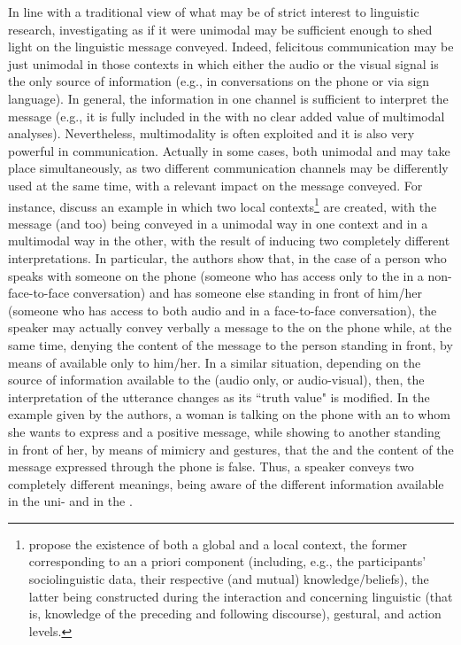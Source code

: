 \documentclass[output=paper]{langsci/langscibook}
\begin{document}
In line with a traditional view of what may be of strict interest to linguistic research, investigating  as if it were unimodal may be sufficient enough to shed light on the linguistic message conveyed. Indeed, felicitous communication may be just unimodal in those contexts in which either the audio or the visual signal is the only source of information (e.g., in conversations on the phone or via sign language). In general, the information in one channel is sufficient to interpret the message (e.g., it is fully included in the  with no clear added value of multimodal analyses). Nevertheless, multimodality is often exploited and it is also very powerful in communication. Actually in some cases, both unimodal and  may take place simultaneously, as two different communication channels may be differently used at the same time, with a relevant impact on the message conveyed. For instance, \citet[118--119]{GiliFivela2014} discuss an example in which two local contexts\footnote{\citet{Akman.2003} propose the existence of both a global and a local context, the former corresponding to an a priori component (including, e.g., the participants’ sociolinguistic data, their respective (and mutual) knowledge\slash beliefs), the latter being constructed during the interaction and concerning linguistic (that is, knowledge of the preceding and following discourse), gestural, and action levels.} are created, with the message (and  too) being conveyed in a unimodal way in one context and in a multimodal way in the other, with the result of inducing two completely different interpretations. In particular, the authors show that, in the case of a person who speaks with someone on the phone (someone who has access only to the  in a non-face-to-face conversation) and has someone else standing in front of him\slash her (someone who has access to both audio and  in a face-to-face conversation), the speaker may actually convey verbally a message to the  on the phone while,  at the same time, denying the content of the message to the person standing in front, by means of  available only to him\slash her. In a similar situation, depending on the source of information available to the  (audio only, or audio-visual), then, the interpretation of the utterance changes as its ``truth value" is modified. In the example given by the authors, a woman is talking on the phone with an  to whom she wants to express  and a positive message, while showing to another  standing in front of her, by means of mimicry and gestures, that the  and the content of the message expressed through the phone is false. Thus, a speaker conveys two completely different meanings, being aware of the different information available in the uni- and in the .\largerpage[2]
\end{document}
